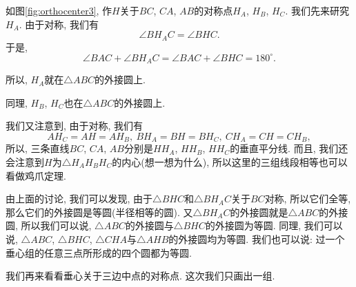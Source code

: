 \documentclass{book}
\begin{document}
\begin{paracol}{2}
\switchcolumn
如图\ref{fig:orthocenter3}, 作$H$关于$BC$, $CA$, $AB$的对称点$H_A$, $H_B$, $H_C$. 我们先来研究$H_A$. 由于对称, 我们有
\[\angle B H_A C=\angle BHC.\]
于是,
\[\angle BAC+\angle B H_A C=\angle BAC+\angle BHC=180^\circ.\]\par
所以, $H_A$就在$\triangle ABC$的外接圆上.\par
同理, $H_B$, $H_C$也在$\triangle ABC$的外接圆上.\par
我们又注意到, 由于对称, 我们有
\[AH_C=AH=AH_B,\ BH_A=BH=BH_C,\ CH_A=CH=CH_B,\]
所以, 三条直线$BC$, $CA$, $AB$分别是$HH_A$, $HH_B$, $HH_C$的垂直平分线. 而且, 我们还会注意到$H$为$\triangle H_AH_BH_C$的内心(想一想为什么), 所以这里的三组线段相等也可以看做鸡爪定理.\par
由上面的讨论, 我们可以发现, 由于$ \triangle BHC $和$ \triangle BH_AC $关于$ BC $对称, 所以它们全等, 那么它们的外接圆是等圆(半径相等的圆). 又$ \triangle BH_AC $的外接圆就是$ \triangle ABC $的外接圆, 所以我们可以说, $ \triangle ABC $的外接圆与$ \triangle BHC $的外接圆为等圆. 同理, 我们可以说, $ \triangle ABC $, $ \triangle BHC $, $ \triangle CHA $与$ \triangle AHB $的外接圆均为等圆. 我们也可以说: 过一个垂心组的任意三点所形成的四个圆都为等圆.\par 
我们再来看看垂心关于三边中点的对称点. 这次我们只画出一组.


\end{paracol}
\end{document}
